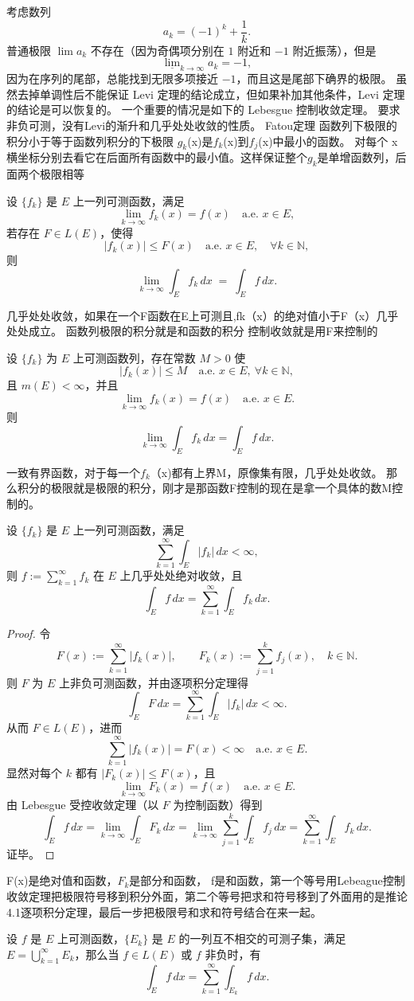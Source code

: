 \documentclass[lang=cn,10pt]{elegantbook}
\begin{document}
考虑数列
\[
a_k = (-1)^k + \frac{1}{k}.
\]
普通极限 $\lim a_k$ 不存在（因为奇偶项分别在 $1$ 附近和 $-1$ 附近振荡），但是
\[
\underline{\lim}_{k \to \infty} a_k = -1,
\]
因为在序列的尾部，总能找到无限多项接近 $-1$，而且这是尾部下确界的极限。
虽然去掉单调性后不能保证 Levi 定理的结论成立，但如果补加其他条件，Levi 定理的结论是可以恢复的。
一个重要的情况是如下的 Lebesgue 控制收敛定理。
要求非负可测，没有Levi的渐升和几乎处处收敛的性质。
Fatou定理 函数列下极限的积分小于等于函数列积分的下极限
$g_k$(x)是$f_k$(x)到$f_j$(x)中最小的函数。 对每个 x 横坐标分别去看它在后面所有函数中的最小值。这样保证整个$g_k$是单增函数列，后面两个极限相等
\begin{theorem}
设 $\{f_k\}$ 是 $E$ 上一列可测函数，满足
\[
\lim_{k \to \infty} f_k(x) = f(x) \quad \text{a.e. } x \in E,
\]
若存在 $F \in L(E)$，使得
\[
|f_k(x)| \le F(x) \quad \text{a.e. } x \in E, \quad \forall k \in \mathbb{N},
\]
则
\[
\lim_{k \to \infty} \int_E f_k \, dx \;=\; \int_E f \, dx .
\]
\end{theorem}
几乎处处收敛，如果在一个F函数在E上可测且,fk（x）的绝对值小于F（x）几乎处处成立。
 函数列极限的积分就是和函数的积分
控制收敛就是用F来控制的
\begin{corollary}[有界收敛定理]
设 $\{f_k\}$ 为 $E$ 上可测函数列，存在常数 $M>0$ 使
\[
|f_k(x)| \le M \quad \text{a.e. } x \in E,\ \forall k\in\mathbb{N},
\]
且 $m(E)<\infty$，并且
\[
\lim_{k\to\infty} f_k(x) = f(x) \quad \text{a.e. } x \in E.
\]
则
\[
\lim_{k\to\infty} \int_E f_k\,dx = \int_E f\,dx.
\]
\end{corollary}
一致有界函数，对于每一个$f_k$（x)都有上界M，原像集有限，几乎处处收敛。
那么积分的极限就是极限的积分，刚才是那函数F控制的现在是拿一个具体的数M控制的。
\begin{corollary}[逐项积分定理]
设 $\{f_k\}$ 是 $E$ 上一列可测函数，满足
\[
\sum_{k=1}^{\infty} \int_E |f_k|\, dx < \infty,
\]
则 $f := \sum_{k=1}^{\infty} f_k$ 在 $E$ 上几乎处处绝对收敛，且
\[
\int_E f\, dx = \sum_{k=1}^{\infty} \int_E f_k\, dx.
\]
\end{corollary}
\begin{proof}
令
\[
F(x):=\sum_{k=1}^{\infty}|f_k(x)|,\qquad 
F_k(x):=\sum_{j=1}^{k}f_j(x),\quad k\in\mathbb{N}.
\]
则 $F$ 为 $E$ 上非负可测函数，并由逐项积分定理得
\[
\int_E F\,dx=\sum_{k=1}^{\infty}\int_E |f_k|\,dx<\infty .
\]
从而 $F\in L(E)$，进而
\[
\sum_{k=1}^{\infty}|f_k(x)|=F(x)<\infty\quad \text{a.e. }x\in E .
\]
显然对每个 $k$ 都有 $|F_k(x)|\le F(x)$，且
\[
\lim_{k\to\infty}F_k(x)=f(x)\quad \text{a.e. }x\in E .
\]
由 Lebesgue 受控收敛定理（以 $F$ 为控制函数）得到
\[
\int_E f\,dx
=\lim_{k\to\infty}\int_E F_k\,dx
=\lim_{k\to\infty}\sum_{j=1}^{k}\int_E f_j\,dx
=\sum_{k=1}^{\infty}\int_E f_k\,dx .
\]
证毕。
\end{proof}
F(x)是绝对值和函数，$F_k$是部分和函数，
f是和函数，第一个等号用Lebeague控制收敛定理把极限符号移到积分外面，第二个等号把求和符号移到了外面用的是推论4.1逐项积分定理，最后一步把极限号和求和符号结合在来一起。
\begin{corollary}[分片积分分定理]
设 $f$ 是 $E$ 上可测函数，$\{E_k\}$ 是 $E$ 的一列互不相交的可测子集，满足 $E = \bigcup_{k=1}^\infty E_k$，那么当 $f \in L(E)$ 或 $f$ 非负时，有
\[
\int_E f\,dx = \sum_{k=1}^\infty \int_{E_k} f\,dx.
\]
\end{corollary}
\end{document}
